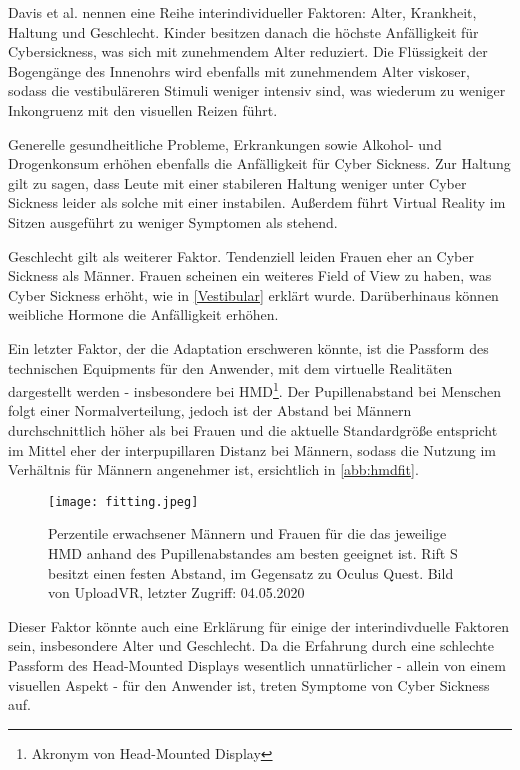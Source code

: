 Davis et al.\cite{Davis:2014:Factors} nennen eine Reihe interindividueller Faktoren: Alter, Krankheit, Haltung und Geschlecht. Kinder besitzen danach die h\"ochste Anf\"alligkeit f\"ur Cybersickness, was sich mit zunehmendem Alter reduziert. Die Fl\"ussigkeit der Bogeng\"ange des Innenohrs wird ebenfalls mit zunehmendem Alter viskoser, sodass die vestibul\"areren Stimuli weniger intensiv sind, was wiederum zu weniger Inkongruenz mit den visuellen Reizen f\"uhrt.

Generelle gesundheitliche Probleme, Erkrankungen sowie Alkohol- und Drogenkonsum\cite{Kruk:1992:Drugs} erh\"ohen ebenfalls die Anf\"alligkeit f\"ur Cyber Sickness. Zur Haltung gilt zu sagen, dass Leute mit einer stabileren Haltung weniger unter Cyber Sickness leider als solche mit einer instabilen. Au{\ss}erdem f\"uhrt Virtual Reality im Sitzen ausgef\"uhrt zu weniger Symptomen als stehend.

Geschlecht gilt als weiterer Faktor. Tendenziell leiden Frauen eher an Cyber Sickness als M\"anner\cite{Aldaba:2019:VRNTread}. Frauen scheinen ein weiteres Field of View zu haben, was Cyber Sickness erh\"oht, wie in \autoref{Vestibular} erkl\"art wurde. Dar\"uberhinaus k\"onnen weibliche Hormone die Anf\"alligkeit erh\"ohen\cite{Kolasinski:1995:control}.


Ein letzter Faktor, der die Adaptation erschweren k\"onnte, ist die Passform des technischen Equipments f\"ur den Anwender, mit dem virtuelle Realit\"aten dargestellt werden - insbesondere bei HMD\footnote{Akronym von Head-Mounted Display}. Der Pupillenabstand bei Menschen folgt einer Normalverteilung, jedoch ist der Abstand bei M\"annern durchschnittlich h\"oher als bei Frauen und die aktuelle Standardgr\"o{\ss}e entspricht im Mittel eher der interpupillaren Distanz bei M\"annern\cite{UploadVR:2020:HMDfit}, sodass die Nutzung im Verh\"altnis f\"ur M\"annern angenehmer ist, ersichtlich in \autoref{abb:hmdfit}. 
\begin{figure}[h]
	\centering 	
	\texttt{[image: fitting.jpeg]}
	\caption{Perzentile erwachsener M\"annern und Frauen f\"ur die das jeweilige HMD anhand des Pupillenabstandes am besten geeignet ist. Rift S besitzt einen festen Abstand, im Gegensatz zu Oculus Quest. Bild von UploadVR\cite{UploadVR:2020:HMDfit}, letzter Zugriff: 04.05.2020}
	\label{abb:hmdfit}
\end{figure}


Dieser Faktor k\"onnte auch eine Erkl\"arung f\"ur einige der interindivduelle Faktoren sein, insbesondere Alter und Geschlecht. Da die Erfahrung durch eine schlechte Passform des Head-Mounted Displays wesentlich unnat\"urlicher - allein von einem visuellen Aspekt - f\"ur den Anwender ist, treten Symptome von Cyber Sickness auf.





